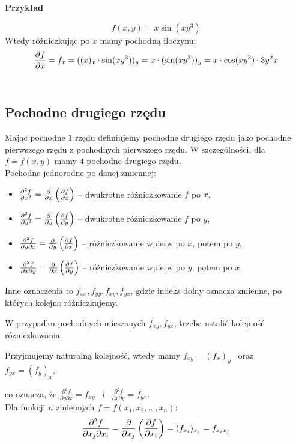 \textbf{Przykład}

$$ f(x,y) = x \sin (xy^3) $$
Wtedy różniczkując po $x$ mamy pochodną iloczynu:
$$ \frac{\partial f}{\partial x} = f_x = ((x)_x \cdot \sin(xy^3))_y = x \cdot (\sin(xy^3))_y = x \cdot \cos(xy^3) \cdot 3y^2 x$$ \\


\subsection*{Pochodne drugiego rzędu}

Mając pochodne $1$ rzędu definiujemy pochodne drugiego rzędu jako pochodne pierwszego rzędu z pochodnych pierwszego rzędu.
W szczególności, dla $ f = f(x,y) $ mamy $4$ pochodne drugiego rzędu. \\

Pochodne \underline{jednorodne} po danej zmiennej:
\begin{itemize}
    \item $ \frac{\partial^2 f}{\partial x^2} = \frac{\partial }{\partial x} \left( \frac{\partial f}{\partial x} \right) $ -- dwukrotne różniczkowanie $f$ po $x$,
    \item $ \frac{\partial^2 f}{\partial y^2} = \frac{\partial }{\partial y} \left( \frac{\partial f}{\partial y} \right) $ -- dwukrotne różniczkowanie $f$ po $y$,
    \item $ \frac{\partial^2 f}{\partial y \partial x} = \frac{\partial }{\partial y} \left( \frac{\partial f}{\partial x} \right) $ -- różniczkowanie wpierw po $x$, potem po $y$,
    \item $ \frac{\partial^2 f}{\partial x \partial y} = \frac{\partial }{\partial x} \left( \frac{\partial f}{\partial y} \right) $ -- różniczkowanie wpierw po $y$, potem po $x$, \\
\end{itemize}

Inne oznaczenia to $ f_{xx}, f_{yy}, f_{xy}, f_{yx} $, gdzie indeks dolny oznacza zmienne, po których kolejno różniczkujemy.

W przypadku pochodnych mieszanych $ f_{xy}, f_{yx} $, trzeba ustalić kolejność różniczkowania.

Przyjmujemy naturalną kolejność, wtedy mamy $ f_{xy} = (f_x)_y $ \ oraz \ $ f_{yx} = (f_y)_x $,

co oznacza, że $ \frac{\partial^2 f}{\partial y \partial x} = f_{xy} $ \ i \ $ \frac{\partial^2 f}{\partial x \partial y} = f_{yx} $. \\

Dla funkcji $n$ zmiennych $ f = f(x_1, x_2, ..., x_n) $:
$$ \frac{\partial^2 f}{\partial x_j \partial x_i} = \frac{\partial }{\partial x_j} \left( \frac{\partial f}{\partial x_i} \right) = (f_{x_i})_{x_j} = f_{x_i x_j} $$ \\

